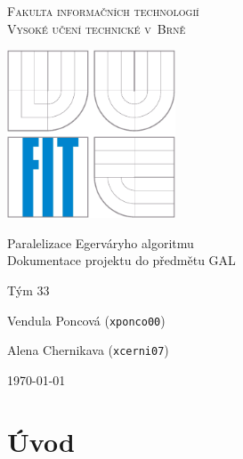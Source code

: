 \documentclass[a4paper, 11pt, titlepage, final]{article}[3. prosinec 2011]
\begin{document}

\begin{titlepage}
\begin{center}

\textsc{
\LARGE Fakulta informačních technologií 
\medskip\\
Vysoké učení technické v~Brně}


{\parbox{5cm}{\centering\includegraphics[height=5cm]{img/logo.eps}}}


{\huge Paralelizace Egerváryho algoritmu} \medskip \\
{\Large Dokumentace projektu do předmětu GAL} 


\end{center}

{\Large
Tým 33

Vendula Poncová (\texttt{xponco00})

Alena Chernikava (\texttt{xcerni07})
} \hfill {\Large\today}

\end{titlepage}


\pagestyle{plain}
\setcounter{page}{1}

\section{Úvod}
 
\end{document}
